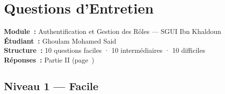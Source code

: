 \documentclass[12pt,a4paper,oneside]{report}
\begin{document}


\chapter*{Questions d'Entretien}

\begin{tcolorbox}[colback=GoldenGlow!8,colframe=GoldenGlow,
  arc=4pt,boxrule=0.7pt]
\textbf{Module~:} Authentification et Gestion des Rôles ---
SGUI Ibn Khaldoun\\
\textbf{Étudiant~:} Ghoulam Mohamed Said\\
\textbf{Structure~:} 10 questions faciles · 10 intermédiaires ·
10 difficiles\\
\textbf{Réponses~:} Partie II (page~\pageref{ch:reponses})
\end{tcolorbox}

\vspace{0.5cm}

\section*{\textcolor{EasyGreen}{Niveau 1 --- Facile}}
\end{document}
